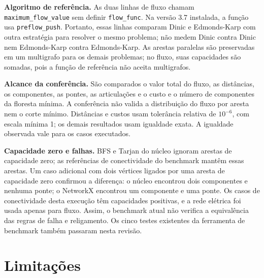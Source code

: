 \documentclass[12pt]{article}
\begin{document}
\textbf{Algoritmo de referência.} As duas linhas de fluxo chamam \texttt{maximum\_flow\_value} sem definir \texttt{flow\_func}. Na versão 3.7 instalada, a função usa \texttt{preflow\_push}. Portanto, essas linhas comparam Dinic e Edmonds-Karp com outra estratégia para resolver o mesmo problema; não medem Dinic contra Dinic nem Edmonds-Karp contra Edmonds-Karp. As arestas paralelas são preservadas em um multigrafo para os demais problemas; no fluxo, suas capacidades são somadas, pois a função de referência não aceita multigrafos.

\textbf{Alcance da conferência.} São comparados o valor total do fluxo, as distâncias, os componentes, as pontes, as articulações e o custo e o número de componentes da floresta mínima. A conferência não valida a distribuição do fluxo por aresta nem o corte mínimo. Distâncias e custos usam tolerância relativa de $10^{-6}$, com escala mínima 1; os demais resultados usam igualdade exata. A igualdade observada vale para os casos executados.

\textbf{Capacidade zero e falhas.} BFS e Tarjan do núcleo ignoram arestas de capacidade zero; as referências de conectividade do benchmark mantêm essas arestas. Um caso adicional com dois vértices ligados por uma aresta de capacidade zero confirmou a diferença: o núcleo encontrou dois componentes e nenhuma ponte; o NetworkX encontrou um componente e uma ponte. Os casos de conectividade desta execução têm capacidades positivas, e a rede elétrica foi usada apenas para fluxo. Assim, o benchmark atual não verifica a equivalência das regras de falha e religamento. Os cinco testes existentes da ferramenta de benchmark também passaram nesta revisão.

\section{Limitações}
\label{sec:limitacoes}
\end{document}
